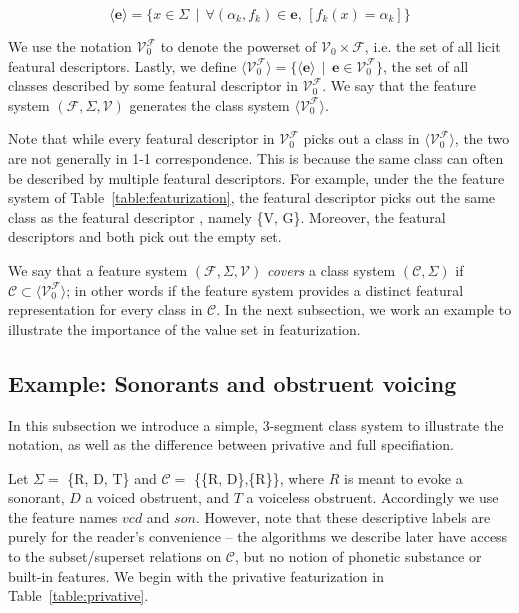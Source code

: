 \documentclass[11pt, oneside]{article}   	%
\begin{document}
$$ \big \langle \mathbf{e} \big \rangle = \{x \in \Sigma \, \mid \, \forall (\alpha_k, f_k) \in \mathbf{e} \text{,  } [ f_k(x) = \alpha_k ] \} $$

\vspace{\baselineskip} \noindent We use the notation $\mathcal V_0^\mathcal F$ to denote the powerset of $\mathcal V_0 \times \mathcal F$, i.e. the set of all licit featural descriptors. Lastly, we define $\langle \mathcal V_0^\mathcal F \rangle = \{ \langle \mathbf{e} \rangle \, \mid \, \mathbf{e} \in \mathcal V_0^\mathcal F \}$, the set of all classes described by some featural descriptor in $\mathcal V_0^\mathcal F$. We say that the feature system $(\mathcal F, \Sigma, \mathcal V)$ generates the class system $\langle \mathcal V_0^\mathcal F \rangle$.

Note that while every featural descriptor in $\mathcal V_0^\mathcal F$ picks out a class in $\langle \mathcal V_0^\mathcal F \rangle$, the two are not generally in 1-1 correspondence. This is because the same class can often be described by multiple featural descriptors. For example, under the the feature system of Table~\ref{table:featurization}, the featural descriptor  picks out the same class as the featural descriptor , namely \{V, G\}. Moreover, the featural descriptors  and  both pick out the empty set.

\vspace{\baselineskip} We say that a feature system $(\mathcal F, \Sigma, \mathcal V)$ \textit{covers} a class system $(\mathcal C, \Sigma)$ if $\mathcal C \subset \langle \mathcal V_0^\mathcal F \rangle$; in other words if the feature system provides a distinct featural representation for every class in $\mathcal C$. In the next subsection, we work an example to illustrate the importance of the value set in featurization.

\subsection{Example: Sonorants and obstruent voicing}

In this subsection we introduce a simple, 3-segment class system to illustrate the notation, as well as the difference between privative and full specifiation.

Let $\Sigma =$ \{R, D, T\} and $\mathcal{C} = $ \{\{R, D\},\{R\}\}, where $R$ is meant to evoke a sonorant, $D$ a voiced obstruent, and $T$ a voiceless obstruent. Accordingly we use the feature names $vcd$ and $son$. However, note that these descriptive labels are purely for the reader's convenience -- the algorithms we describe later have access to the subset/superset relations on $\mathcal C$, but no notion of phonetic substance or built-in features. We begin with the privative featurization in Table~\ref{table:privative}.
\end{document}
